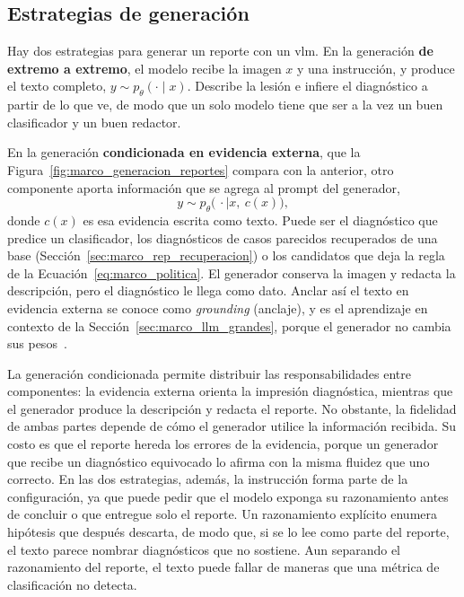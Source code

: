 \subsection{Estrategias de generación}
\label{sec:marco_rep_generacion}

Hay dos estrategias para generar un reporte con un \gls{vlm}. En la generación \textbf{de extremo a extremo},
el modelo recibe la imagen $x$ y una instrucción, y produce el texto completo, $y \sim p_\theta(\cdot \mid x)$. Describe la lesión e infiere el diagnóstico a partir de lo que
ve, de modo que un solo modelo tiene que ser a la vez un buen clasificador y un buen redactor.



En la generación \textbf{condicionada en evidencia externa}, que la Figura~\ref{fig:marco_generacion_reportes}
compara con la anterior, otro componente aporta información que se agrega al prompt del generador,
\begin{equation}
    y \sim p_\theta\bigl(\,\cdot \mid x,\ c(x)\bigr),
    \label{eq:marco_rep_condicionada}
\end{equation}
donde $c(x)$ es esa evidencia escrita como texto. Puede ser el diagnóstico que predice un clasificador, los
diagnósticos de casos parecidos recuperados de una base (Sección~\ref{sec:marco_rep_recuperacion}) o los
candidatos que deja la regla de la Ecuación~\ref{eq:marco_politica}. El generador conserva la imagen y redacta
la descripción, pero el diagnóstico le llega como dato. Anclar así el texto en evidencia externa se conoce como
\emph{grounding} (anclaje), y es el aprendizaje en contexto de la Sección~\ref{sec:marco_llm_grandes}, porque el
generador no cambia sus pesos~\cite{brown2020language}.

La generación condicionada permite distribuir las responsabilidades entre componentes: la evidencia externa orienta la impresión diagnóstica, mientras que el generador produce la descripción y redacta el reporte. No obstante, la fidelidad de ambas partes depende de cómo el generador utilice la información recibida. Su costo es que el reporte hereda los errores de la
evidencia, porque un generador que recibe un diagnóstico equivocado lo afirma con la misma fluidez que uno
correcto. En las dos estrategias, además, la instrucción forma parte de la configuración, ya que puede pedir
que el modelo exponga su razonamiento antes de concluir o que entregue solo el reporte. Un razonamiento
explícito enumera hipótesis que después descarta, de modo que, si se lo lee como parte del reporte, el texto
parece nombrar diagnósticos que no sostiene. Aun separando el razonamiento del reporte, el texto puede fallar de
maneras que una métrica de clasificación no detecta.

